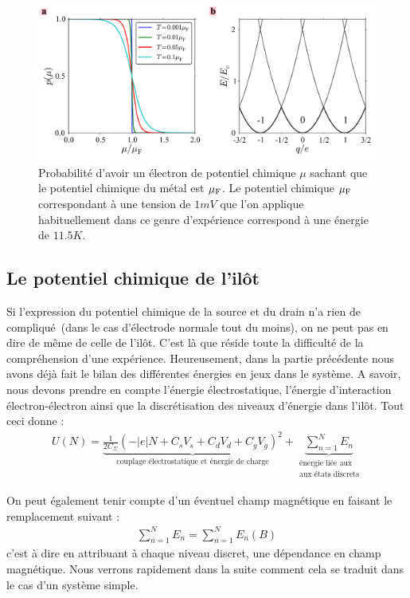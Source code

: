\begin{figure}
\centering \includegraphics[scale=0.5]{Theorie/Transport/figure2/figure2.pdf} 
\caption{Probabilité d'avoir un électron de potentiel chimique $\mu$ sachant que le potentiel chimique du métal est $\mu_{\rm{F}}$. Le potentiel chimique $\mu_{\rm{F}}$ correspondant à une tension de $1mV$ que l'on applique habituellement dans ce genre d'expérience correspond à une énergie de $11.5K$.}
\label{distrib_fermi}
\end{figure}



\subsection{Le potentiel chimique de l'il\^ot}
Si l'expression du potentiel chimique de la source et du drain n'a rien de compliqué~(dans le cas d'électrode normale tout du moins), on ne peut pas en dire de m\^eme de celle de l'il\^ot. C'est là que réside toute la difficulté de la compréhension d'une expérience. Heureusement, dans la partie précédente nous avons déjà fait le bilan des différentes énergies en jeux dans le système. A savoir, nous devons prendre en compte l'énergie électrostatique, l'énergie d'interaction électron-électron ainsi que la discrétisation des niveaux d'énergie dans l'il\^ot. Tout ceci donne :
\begin{eqnarray}
U(N) = \underbrace{\frac{1}{2C_{\Sigma}} (-|e|N + C_sV_s + C_dV_d + C_gV_g)^2}_{\text{couplage électrostatique et énergie de charge}}
+ 
\underbrace{\sum_{n=1}^{N} E_n}_{\substack{\text{énergie liée aux} \\\text{aux états discrets}}}
\end{eqnarray}

On peut également tenir compte d'un éventuel champ magnétique en faisant le remplacement suivant :
\begin{eqnarray}
\sum_{n=1}^N E_n = \sum_{n=1}^N E_n(B) \nonumber
\end{eqnarray}
c'est à dire en attribuant à chaque niveau discret, une dépendance en champ magnétique. Nous verrons rapidement dans la suite comment cela se traduit dans le cas d'un système simple. 

